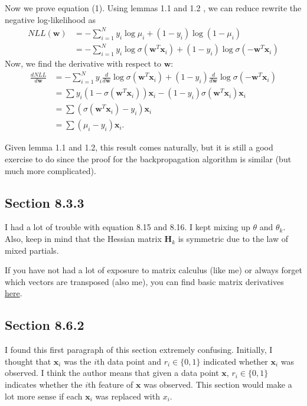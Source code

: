 \documentclass[a4paper,11pt]{article}
\theoremstyle{plain}
\newcounter{exercise}
\begin{document}
Now we prove equation (1). Using lemmas 1.1 and 1.2 , we can
reduce rewrite the negative log-likelihood as \\
\begin{align*}
    NLL(\mathbf{w})&=-\sum \limits_{i=1}^{N}y_i\log\mu_i +
    (1-y_i)\log(1-\mu_i) \\
    & = -\sum \limits_{i=1}^{N}y_i\log\sigma(\mathbf{w}^{T}
    \mathbf{x}_i) + (1 - y_i)\log\sigma(-\mathbf{w}^{T}
    \mathbf{x}_i)
\end{align*}
Now, we find the derivative with respect to $\mathbf{w}$:
\begin{align*}
    \frac{dNLL}{d\mathbf{w}}
    &= -\sum \limits_{i=1}^{N}y_i
    \frac{d}{d\mathbf{w}}
    \log\sigma(\mathbf{w}^{T}\mathbf{x}_i) + 
    (1 - y_i)
    \frac{d}{d\mathbf{w}}
    \log\sigma(-\mathbf{w}^{T} \mathbf{x}_i) \\
    &= \sum
    y_i (1-\sigma(\mathbf{w}^{T}\mathbf{x}_i))\mathbf{x}_i
    -(1-y_i)\sigma(\mathbf{w}^{T}\mathbf{x}_i)\mathbf{x}_i\\
    &= \sum (\sigma(\mathbf{w}^{T}\mathbf{x}_i)-y_i)
    \mathbf{x}_i \\
    &= \sum (\mu_i - y_i)\mathbf{x}_i.
\end{align*}

Given lemma 1.1 and 1.2, this result comes naturally,
but it is still a good exercise to do since the proof for
the backpropagation algorithm is similar (but much more
complicated).

\subsection*{Section 8.3.3}
I had a lot of trouble with equation 8.15 and 8.16. I 
kept mixing up $\theta$ and $\theta_k$. Also, keep in
mind that the Hessian matrix $\mathbf{H}_k$ is symmetric
due to the law of mixed partials.

If you have not had a lot of exposure to matrix calculus (like me)
or always forget which vectors are transposed (also me),
you can find basic matrix derivatives
\href{http://www.gatsby.ucl.ac.uk/teaching/courses/sntn/sntn-2017/resources/Matrix_derivatives_cribsheet.pdf}{here}.

\subsection*{Section 8.6.2}
I found this first paragraph of this section extremely confusing. Initially, I thought
that $\mathbf{x}_i$ was the $i$th data point and $r_i  \in \{0, 1\}$ indicated whether
$ \mathbf{x}_i$ was observed. I think the author means that given a
data point $\mathbf{x}$, $r_i\in\{0, 1\}$ indicates whether the $i$th feature of
$\mathbf{x}$ was observed. This section would make a lot more sense if each $\mathbf{x}_i$ 
was replaced with $x_i$.
\end{document}
